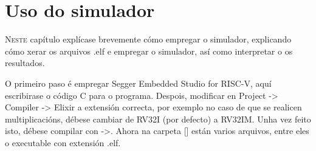 \chapter{Uso do simulador}
\label{chap:uso_simulador}

\lettrine{N}{este} capítulo explícase brevemente cómo empregar o simulador, explicando cómo xerar os arquivos .elf e empregar o simulador, así como interpretar o os resultados. 

O primeiro paso é empregar Segger Embedded Studio for RISC-V, aquí escribirase o código C para o programa. Despois, modificar en Project -> Compiler -> Elixir a extensión correcta, por exemplo no caso de que se realicen multiplicacións, débese cambiar de RV32I (por defecto) a RV32IM. Unha vez feito isto, débese compilar con ->. Ahora na carpeta [] están varios arquivos, entre eles o executable con extensión .elf.
